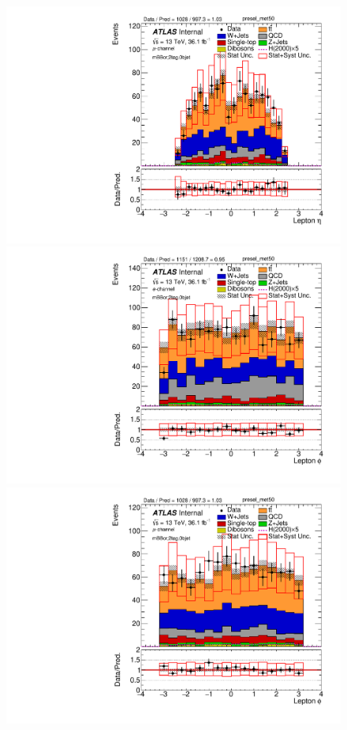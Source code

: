 \begin{figure}[!h]
\begin{center}
\includegraphics[scale=0.33]{./figures/boosted/PlotByChannels/DataMC_2tag_0bjet_mbbcr_muon_presel_met50_LepEta}                                                                                     
\includegraphics[scale=0.33]{./figures/boosted/PlotByChannels/DataMC_2tag_0bjet_mbbcr_elec_presel_met50_LepPhi}                                                                                     
\includegraphics[scale=0.33]{./figures/boosted/PlotByChannels/DataMC_2tag_0bjet_mbbcr_muon_presel_met50_LepPhi}                                                                                     

\end{center}
\end{figure}
